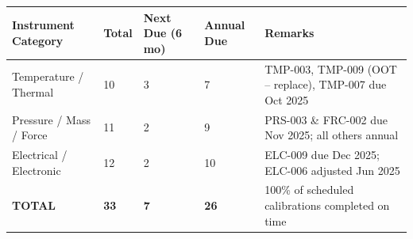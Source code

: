 \noindent
\begin{tcolorbox}[
  enhanced,
  colback=LightGray,
  colframe=NexaSilver,
  arc=4pt,
  boxrule=0.6pt,
  left=8pt, right=8pt, top=6pt, bottom=6pt,
  title={\faClipboardList\; Calibration Status Overview \& Upcoming Due Dates},
  fonttitle=\small\bfseries\color{NexaBlue},
  attach boxed title to top left={yshift=-2mm, xshift=6mm},
  boxed title style={colback=NexaSilver, colframe=NexaSilver, arc=3pt}
]
\setlength{\arrayrulewidth}{0.4pt}
{\small
{}
\begin{tabular}{|L{2.5cm}|C{1.6cm}|C{1.6cm}|C{1.6cm}|L{5.5cm}|}
\color{white}\bfseries Instrument Category &
\color{white}\bfseries Total &
\color{white}\bfseries Next Due (6 mo) &
\color{white}\bfseries Annual Due &
\color{white}\bfseries Remarks \\
\midrule
Temperature / Thermal & 10 & 3 & 7 & TMP-003, TMP-009 (OOT -- replace), TMP-007 due Oct 2025 \\
Pressure / Mass / Force & 11 & 2 & 9 & PRS-003 \& FRC-002 due Nov 2025; all others annual \\
Electrical / Electronic & 12 & 2 & 10 & ELC-009 due Dec 2025; ELC-006 adjusted Jun 2025 \\
\midrule
{}
\bfseries TOTAL & \bfseries 33 & \bfseries 7 & \bfseries 26 & 100\% of scheduled calibrations completed on time \\
\end{tabular}
}
\end{tcolorbox}

\vspace{6pt}

